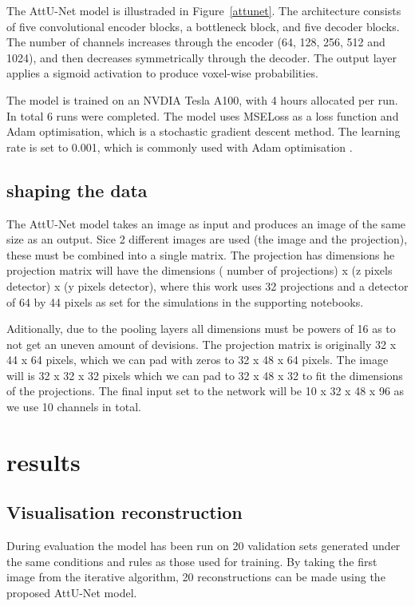 \documentclass{article}
\begin{document}
The AttU-Net model is illustraded in Figure~\ref{attunet}. The architecture consists of five convolutional encoder blocks, a bottleneck block, and five decoder blocks. The number of channels increases through the encoder (64, 128, 256, 512 and 1024), and then decreases symmetrically through the decoder. The output layer applies a sigmoid activation to produce voxel-wise probabilities.

The model is trained on an NVDIA Tesla A100, with 4 hours allocated per run. In total 6 runs were completed. The model uses MSELoss as a loss function and Adam optimisation, which is a stochastic gradient descent method. The learning rate is set to 0.001, which is commonly used with Adam optimisation \citep{kingma2014adam}.

\subsection{shaping the data}

The AttU-Net model takes an image as input and produces an image of the same size as an output. Sice 2 different images are used (the image and the projection), these must be combined into a single matrix. The projection has dimensions he projection matrix will have the dimensions ( number of projections) x (z pixels detector) x (y pixels detector), where this work uses 32 projections and a detector of 64 by 44 pixels as set for the simulations in the supporting notebooks.

Aditionally, due to the pooling layers all dimensions must be powers of 16 as to not get an uneven amount of devisions. The projection matrix is originally 32 x 44 x 64 pixels, which we can pad with zeros to 32 x 48 x 64 pixels. The image will is 32 x 32 x 32 pixels which we can pad to 32 x 48 x 32 to fit the dimensions of the projections. The final input set to the network will be 10 x 32 x 48 x 96 as we use 10 channels in total.

\section{results}

\subsection{Visualisation reconstruction}

During evaluation the model has been run on 20 validation sets generated under the same conditions and rules as those used for training. By taking the first image from the iterative algorithm, 20 reconstructions can be made using the proposed AttU-Net model.
\end{document}
